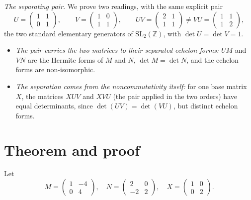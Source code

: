 \documentclass[11pt]{article}
\renewcommand{\_}{\oldus\allowbreak}
\theoremstyle{remark}
\newcommand{\Z}{\mathbb{Z}}
\begin{document}
\emph{The separating pair.} We prove two readings, with the same explicit pair
\[
U=\begin{pmatrix}1&1\\0&1\end{pmatrix},\qquad
V=\begin{pmatrix}1&0\\1&1\end{pmatrix},\qquad
UV=\begin{pmatrix}2&1\\1&1\end{pmatrix}\neq
VU=\begin{pmatrix}1&1\\1&2\end{pmatrix},
\]
the two standard elementary generators of $\mathrm{SL}_2(\Z)$, with $\det U=\det V=1$.
\begin{itemize}
\item[(A)] \emph{The pair carries the two matrices to their separated echelon forms:}
$UM$ and $VN$ are the Hermite forms of $M$ and $N$, $\det M=\det N$, and the echelon
forms are non-isomorphic.
\item[(B)] \emph{The separation comes from the noncommutativity itself:} for one base
matrix $X$, the matrices $XUV$ and $XVU$ (the pair applied in the two orders) have equal
determinants, since $\det(UV)=\det(VU)$, but distinct echelon forms.
\end{itemize}

\section{Theorem and proof}
Let
\[
M=\begin{pmatrix}1&-4\\0&4\end{pmatrix},\quad
N=\begin{pmatrix}2&0\\-2&2\end{pmatrix},\quad
X=\begin{pmatrix}1&0\\0&2\end{pmatrix}.
\]
\end{document}
